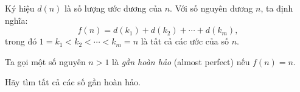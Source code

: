 \ifshowproblem
\begin{problem}\label{example:EMC-2015-J-P3}
    Ký hiệu \( d(n) \) là số lượng ước dương của \( n \).  
    Với số nguyên dương \( n \), ta định nghĩa:
    \[
        f(n) = d(k_1) + d(k_2) + \cdots + d(k_m),
    \]
    trong đó \( 1 = k_1 < k_2 < \cdots < k_m = n \) là tất cả các ước của số \( n \).
    
    Ta gọi một số nguyên \( n > 1 \) là \textit{gần hoàn hảo} (almost perfect) nếu \( f(n) = n \).
    
    Hãy tìm tất cả các số gần hoàn hảo.    
\end{problem}
\fi

\fi